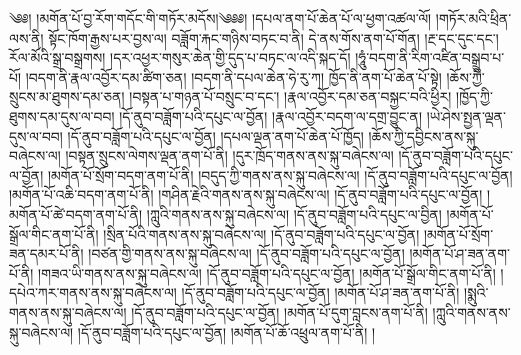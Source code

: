 ༄༅། །མགོན་པོ་བྱ་རོག་གདོང་གི་གཏོར་མདོས།༄༅༅། །དཔལ་ནག་པོ་ཆེན་པོ་ལ་ཕྱག་འཚལ་ལོ། །གཏོར་མའི་ཕྲིན་ལས་ནི། སྟོང་ཁོག་རྒྱས་པར་བྱས་ལ། བཟློག་རྐང་གཉིས་བཏང་བ་ནི། དེ་ནས་གོས་ནག་པོ་གོན། །རྔ་དང་དུང་དང་། རོལ་མོའི་སྒྲ་བསྒྲགས། །དར་འཕྱར་གསུར་ཆེན་གྱི་དུད་པ་བཏང་ལ་འདི་སྐད་དོ། །ཧཱུཾ་བདག་ནི་རིག་འཛིན་བསྒྲུབ་པ་པོ། །བདག་ནི་རྣལ་འབྱོར་དམ་ཚིག་ཅན། །བདག་ནི་དཔལ་ཆེན་ཧེ་རུ་ཀ། ཁྱོད་ནི་ནག་པོ་ཆེན་པོ་སྟེ། །ཆོས་ཀྱི་སྲུངས་མ་ཐུགས་དམ་ཅན། །བསྟན་པ་གཉན་པོ་བསྲུང་བ་དང་། །རྣལ་འབྱོར་དམ་ཅན་བསྐྱང་བའི་ཕྱིར། །ཁྱོད་ཀྱི་ཐུགས་དམ་དུས་ལ་བབ། །དོ་ནུབ་བཟློག་པའི་དཔུང་ལ་བྱོན། །རྣལ་འབྱོར་བདག་ལ་དགྲ་བྱུང་ན། །ཡེ་ཤེས་སྤྱན་ལྡན་དུས་ལ་བབ། །དོ་ནུབ་བཟློག་པའི་དཔུང་ལ་བྱོན། །དཔལ་ལྡན་ནག་པོ་ཆེན་པོ་ཁྱོད། །ཆོས་ཀྱི་དབྱིངས་ནས་སྐུ་བཞེངས་ལ། །བསྟན་སྲུངས་ལེགས་ལྡན་ནག་པོ་ནི། །དུར་ཁྲོད་གནས་ནས་སྐུ་བཞེངས་ལ། །དོ་ནུབ་བཟློག་པའི་དཔུང་ལ་བྱོན། །མགོན་པོ་སྲོག་བདག་ནག་པོ་ནི། །བདུད་ཀྱི་གནས་ནས་སྐུ་བཞེངས་ལ། །དོ་ནུབ་བཟློག་པའི་དཔུང་ལ་བྱོན། །མགོན་པོ་འཆི་བདག་ནག་པོ་ནི། །གཤིན་རྗེའི་གནས་ནས་སྐུ་བཞེངས་ལ། །དོ་ནུབ་བཟློག་པའི་དཔུང་ལ་བྱོན། །མགོན་པོ་ཚེ་བདག་ནག་པོ་ནི། །ཀླུའི་གནས་ནས་སྐུ་བཞེངས་ལ། །དོ་ནུབ་བཟློག་པའི་དཔུང་ལ་བྱིན། །མགོན་པོ་སྒྲོལ་གིང་ནག་པོ་ནི། །སྲིན་པོའི་གནས་ནས་སྐུ་བཞེངས་ལ། །དོ་ནུབ་བཟློག་པའི་དཔུང་ལ་བྱོན། །མགོན་པོ་སྲོག་ཟན་དམར་པོ་ནི། །བཙན་གྱི་གནས་ནས་སྐུ་བཞེངས་ལ། །དོ་ནུབ་བཟློག་པའི་དཔུང་ལ་བྱོན། །མགོན་པོ་ཤ་ཟན་ནག་པོ་ནི། །གཟའ་ཡི་གནས་ནས་སྐུ་བཞེངས་ལ། །དོ་ནུབ་བཟློག་པའི་དཔུང་ལ་བྱོན། །མགོན་པོ་སྒྲོལ་གིང་ནག་པོ་ནི། །དཔེའ་ཀར་གནས་ནས་སྐུ་བཞེངས་ལ། །དོ་ནུབ་བཟློག་པའི་དཔུང་ལ་བྱོན། །མགོན་པོ་ཤ་ཟན་ནག་པོ་ནི། །སྨུའི་གནས་ནས་སྐུ་བཞེངས་ལ། །དོ་ནུབ་བཟློག་པའི་དཔུང་ལ་བྱོན། །མགོན་པོ་དུག་བླངས་ནག་པོ་ནི། །ཀླུའི་གནས་ནས་སྐུ་བཞེངས་ལ། །དོ་ནུབ་བཟློག་པའི་དཔུང་ལ་བྱོན། །མགོན་པོ་ཆོ་འཕྲུལ་ནག་པོ་ནི། །
